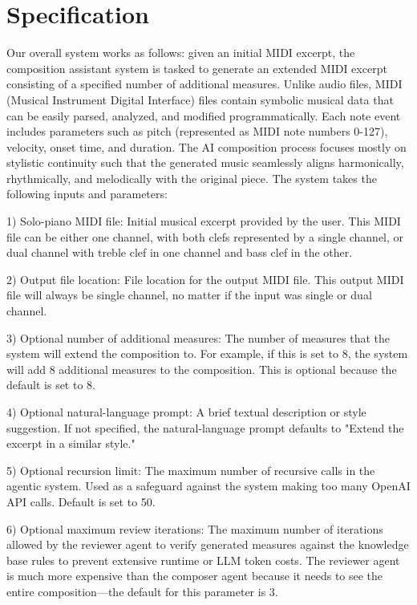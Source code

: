 \documentclass[conference]{IEEEtran}
\begin{document}
\section{Specification}

Our overall system works as follows: given an initial MIDI excerpt, the composition assistant system is tasked to generate an extended MIDI excerpt consisting of a specified number of additional measures. Unlike audio files, MIDI (Musical Instrument Digital Interface) files contain symbolic musical data that can be easily parsed, analyzed, and modified programmatically. Each note event includes parameters such as pitch (represented as MIDI note numbers 0-127), velocity, onset time, and duration. The AI composition process focuses mostly on stylistic continuity such that the generated music seamlessly aligns harmonically, rhythmically, and melodically with the original piece. The system takes the following inputs and parameters: 

1) Solo-piano MIDI file: Initial musical excerpt provided by the user. This MIDI file can be either one channel, with both clefs represented by a single channel, or dual channel with treble clef in one channel and bass clef in the other.  

2) Output file location: File location for the output MIDI file. This output MIDI file will always be single channel, no matter if the input was single or dual channel. 

3) Optional number of additional measures: The number of measures that the system will extend the composition to. For example, if this is set to 8, the system will add 8 additional measures to the composition. This is optional because the default is set to 8. 

4) Optional natural-language prompt: A brief textual description or style suggestion. If not specified, the natural-language prompt defaults to "Extend the excerpt in a similar style." 

5) Optional recursion limit: The maximum number of recursive calls in the agentic system. Used as a safeguard against the system making too many OpenAI API calls. Default is set to 50. 

6) Optional maximum review iterations: The maximum number of iterations allowed by the reviewer agent to verify generated measures against the knowledge base rules to prevent extensive runtime or LLM token costs. The reviewer agent is much more expensive than the composer agent because it needs to see the entire composition—the default for this parameter is 3. 
\end{document}
